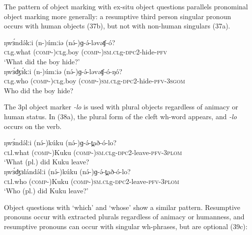 The pattern of object marking with ex-situ object questions parallels pronominal object marking more generally: a resumptive third person singular pronoun occurs with human objects (37b), but not with non-human singulars (37a).


\ea
\ea \gll	ŋwɜ́ndə́kːi	(n-)úmːiə	(nə́-)ɡ-ə́-ləvəʧ-ó?	\\
		\textsc{cl}g.what	(\textsc{comp-})\textsc{cl}g.boy	(\textsc{comp-})\textsc{sm.cl}g-\textsc{dpc}2-hide-\textsc{pfv}\\
\trans		‘What did the boy hide?’\\
\ex \gll	ŋwɜ́ʤɜ́kːi	(n-)úmːiə	(nə́-)ɡ-ə́-ləvəʧ-ó-ŋó?\\
		\textsc{cl}g.who	(\textsc{comp-})\textsc{cl}g.boy	(\textsc{comp-})\textsc{sm.cl}g-\textsc{dpc}2-hide-\textsc{pfv}-3\textsc{sgom}\\
\trans		Who did the boy hide?\\
\z
\z

The 3pl object marker \textit{-lo} is used with plural objects regardless of animacy or human status. In (38a), the plural form of the cleft wh-word appears, and \textit{-lo} occurs on the verb. 

\ea
\ea \gll	ŋwɜ́ndə́lːi	(nə́-)kúku	(nə́-)ɡ-ə́-t̪að-ó-lo?\\
	\textsc{cl}l.what	(\textsc{comp-})Kuku	(\textsc{comp-})\textsc{sm.cl}g-\textsc{dpc}2-leave-\textsc{pfv}-3\textsc{plom}\\
\trans		‘What (pl.) did Kuku leave?			 \\
\ex \gll	ŋwɜ́ʤɜlándə́lːi	(nə́-)kúku	(nə́-)ɡ-ə́-t̪að-ó-lo?\\
	\textsc{cl}l.who	(\textsc{comp-})Kuku  (\textsc{comp-})\textsc{sm.cl}g-\textsc{dpc}2-leave-\textsc{pfv}-3\textsc{plom}\\
\trans		‘Who (pl.) did Kuku leave?’	\\
\z
\z

Object questions with ‘which’ and ‘whose’ show a similar pattern.  Resumptive pronouns occur with extracted plurals regardless of animacy or humanness, and resumptive pronouns can occur with singular wh-phrases, but are optional (39c): 

